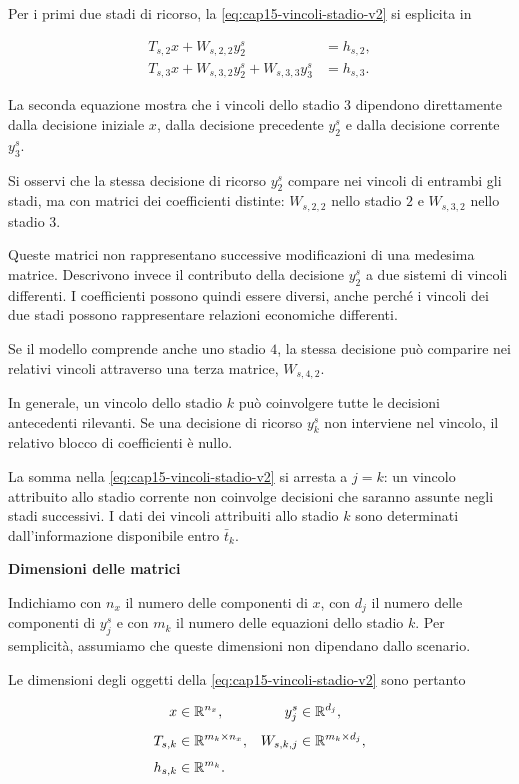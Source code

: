 Per i primi due stadi di ricorso,
la \eqref{eq:cap15-vincoli-stadio-v2}
si esplicita in

\[
\begin{aligned}
T_{s,2}x+
W_{s,2,2}y_2^s
&=h_{s,2},
\\[4pt]
T_{s,3}x+
W_{s,3,2}y_2^s+
W_{s,3,3}y_3^s
&=h_{s,3}.
\end{aligned}
\]

La seconda equazione mostra che
i vincoli dello stadio $3$
dipendono direttamente
dalla decisione iniziale $x$,
dalla decisione precedente
$y_2^s$ e dalla decisione
corrente $y_3^s$.


Si osservi che la stessa decisione di ricorso
$y_2^s$ compare nei vincoli di entrambi gli
stadi, ma con matrici dei coefficienti
distinte: $W_{s,2,2}$ nello stadio $2$
e $W_{s,3,2}$ nello stadio $3$.

Queste matrici non rappresentano successive
modificazioni di una medesima matrice.
Descrivono invece il contributo della
decisione $y_2^s$ a due sistemi di vincoli
differenti. I coefficienti possono quindi
essere diversi, anche perch\'{e} i vincoli
dei due stadi possono rappresentare
relazioni economiche differenti.

Se il modello comprende anche uno stadio
$4$, la stessa decisione pu\`{o} comparire
nei relativi vincoli attraverso una terza
matrice, $W_{s,4,2}$.


In generale,
un vincolo dello stadio $k$
pu\`o coinvolgere tutte
le decisioni antecedenti
rilevanti. Se una decisione di ricorso $y_k^s$
non interviene nel vincolo,
il relativo blocco di
coefficienti \`e nullo.

La somma nella
\eqref{eq:cap15-vincoli-stadio-v2}
si arresta a $j=k$:
un vincolo attribuito allo
stadio corrente non coinvolge
decisioni che saranno assunte
negli stadi successivi.
I dati dei vincoli attribuiti
allo stadio $k$ sono determinati
dall'informazione disponibile
entro $\bar t_k$.

\medskip

\noindent
\textbf{Dimensioni delle matrici}

Indichiamo con $n_x$ il numero
delle componenti di $x$,
con $d_j$ il numero delle
componenti di $y_j^s$ e
con $m_k$ il numero delle
equazioni dello stadio $k$.
Per semplicit\`a, assumiamo
che queste dimensioni non
dipendano dallo scenario.

Le dimensioni degli oggetti
della \eqref{eq:cap15-vincoli-stadio-v2}
sono pertanto

\[
\begin{aligned}
x&\in\mathbb{R}^{n_x},
&
y_j^s&\in\mathbb{R}^{d_j},
\\[4pt]
T_{s,k}&\in\mathbb{R}^{m_k\times n_x},
&
W_{s,k,j}&\in\mathbb{R}^{m_k\times d_j},
\\[4pt]
h_{s,k}&\in\mathbb{R}^{m_k}.
\end{aligned}
\]

